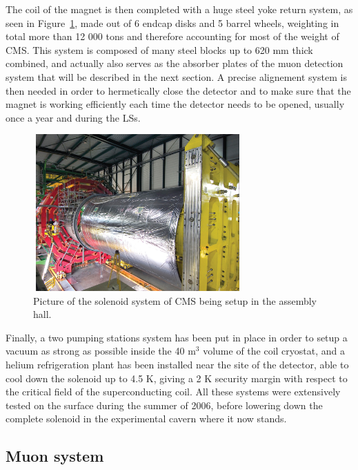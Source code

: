 \documentclass[a4paper, 10pt, openright]{report}
\begin{document}
The coil of the magnet is then completed with a huge steel yoke return system, as seen in Figure~\ref{fig:CMSMagnet}, made out of 6 endcap disks and 5 barrel wheels, weighting in total more than 12 000 tons and therefore accounting for most of the weight of \ac{CMS}. This system is composed of many steel blocks up to 620 mm thick combined, and actually also serves as the absorber plates of the muon detection system that will be described in the next section. A precise alignement system is then needed in order to hermetically close the detector and to make sure that the magnet is working efficiently each time the detector needs to be opened, usually once a year and during the \acfp{LS}. 

\begin{figure}[htbp]
\begin{center}
\includegraphics[width=8cm, height=6cm]{figs/CMSMagnet.jpg}
\caption{Picture of the solenoid system of \ac{CMS} being setup in the assembly hall.}
\label{fig:CMSMagnet}
\end{center}
\end{figure}

Finally, a two pumping stations system has been put in place in order to setup a vacuum as strong as possible inside the 40 m$^3$ volume of the coil cryostat, and a helium refrigeration plant has been installed near the site of the detector, able to cool down the solenoid up to 4.5 K, giving a 2 K security margin with respect to the critical field of the superconducting coil. All these systems were extensively tested on the surface during the summer of 2006, before lowering down the complete solenoid in the experimental cavern where it now stands.

\subsection{Muon system} \label{subsection:Muon}
\end{document}
